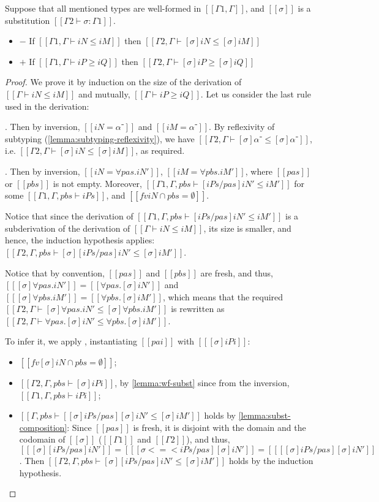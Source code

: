 \begin{corollary}
\begin{lemma}
  \label{lemma:subst-pres-subt}
  Suppose that all mentioned types are well-formed in $[[Γ1 , Γ]]$,
  and $[[σ]]$ is a substitution $[[Γ2 ⊢ σ : Γ1]]$.
  \begin{itemize}
    \item $-$ If $[[Γ1 , Γ ⊢ iN ≤ iM]]$ then $[[Γ2 , Γ ⊢ [σ]iN ≤ [σ]iM]]$
    \item $+$ If $[[Γ1 , Γ ⊢ iP ≥ iQ]]$ then $[[Γ2 , Γ ⊢ [σ]iP ≥ [σ]iQ]]$
  \end{itemize}
\end{lemma}
\begin{proof}
  We prove it by induction on the size of the derivation of $[[Γ ⊢ iN ≤ iM]]$
  and mutually, $[[Γ ⊢ iP ≥ iQ]]$. Let us consider the last rule 
  used in the derivation:
  \begin{caseof}
    \item {}. Then by inversion, 
      $[[iN = α⁻]]$ and $[[iM = α⁻]]$. By reflexivity of subtyping
      (\cref{lemma:subtyping-reflexivity}),
      we have $[[Γ2, Γ ⊢ [σ]α⁻ ≤ [σ]α⁻]]$, i.e. $[[Γ2, Γ ⊢ [σ]iN ≤ [σ]iM]]$,
      as required.
    \item  {}. Then by inversion,
      $[[iN = ∀pas.iN']]$, $[[iM = ∀pbs.iM']]$, where $[[pas]]$ or $[[pbs]]$ is not empty.
      Moreover, $[[Γ1 , Γ, pbs ⊢ [iPs/pas]iN' ≤ iM']]$ for some $[[Γ1 , Γ, pbs ⊢ iPs]]$, and 
      $[[fv iN ∩ {pbs} = ∅ ]]$.

      Notice that since the derivation of $[[Γ1, Γ, pbs ⊢ [iPs/pas]iN' ≤ iM']]$ is
      a subderivation of the derivation of $[[Γ ⊢ iN ≤ iM]]$, its size is smaller, 
      and hence, the induction hypothesis applies:
      $[[Γ2 , Γ, pbs ⊢ [σ][iPs/pas]iN' ≤ [σ]iM']]$.

      Notice that by convention, $[[pas]]$ and $[[pbs]]$ are fresh, and thus,  
      $[[ [σ]∀pas.iN' ]] = [[ ∀pas.[σ]iN' ]]$ and $[[ [σ]∀pbs.iM' ]] = [[ ∀pbs.[σ]iM' ]]$, 
      which means that the required $[[Γ2, Γ ⊢ [σ]∀pas.iN' ≤ [σ]∀pbs.iM']]$ is rewritten as
      $[[Γ2 , Γ ⊢ ∀pas.[σ]iN' ≤ ∀pbs.[σ]iM']]$.

      To infer it, we apply , 
      instantiating $[[pai]]$ with $[[ [σ]iPi ]]$:
      \begin{itemize}
        \item $[[fv [σ]iN ∩ {pbs} = ∅ ]]$;
        \item $[[Γ2, Γ,pbs⊢ [σ]iPi]]$, by \cref{lemma:wf-subst} since from the inversion,
          $[[Γ1, Γ, pbs ⊢ iPi]]$;
        \item $[[Γ, pbs ⊢ [ [σ]iPs/pas ][σ]iN' ≤ [σ]iM']]$ holds
          by \cref{lemma:subst-composition}:
          Since $[[pas]]$ is fresh, it is disjoint with the domain and the codomain of $[[σ]]$
          ($[[Γ1]]$ and $[[Γ2]]$), and thus, 
          $[[ [σ][iPs/pas]iN' ]] = [[ [ σ <=< iPs/pas ][σ]iN' ]] = [[ [ [σ]iPs/pas ][σ]iN' ]]$.
          Then $[[Γ2, Γ, pbs ⊢ [σ][iPs/pas]iN' ≤ [σ]iM']]$ holds by the induction hypothesis.
      \end{itemize}


\end{caseof}
\end{proof}
\end{corollary}
